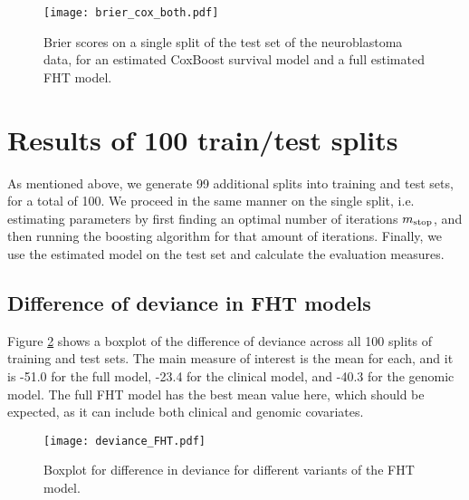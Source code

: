 \begin{figure}
\caption{Brier scores on a single split of the test set of the neuroblastoma data, for an estimated CoxBoost survival model and a full estimated FHT model.}
\label{fig:brier-cox-both}
\centering\texttt{[image: brier\_cox\_both.pdf]}
\end{figure}




\section{Results of 100 train/test splits}
As mentioned above, we generate 99 additional splits into training and test sets, for a total of 100.
We proceed in the same manner on the single split, i.e. estimating parameters by first finding an optimal number of iterations $m_{\text{stop}}$, and then running the boosting algorithm for that amount of iterations.
Finally, we use the estimated model on the test set and calculate the evaluation measures.

\subsection{Difference of deviance in FHT models}
Figure \ref{fig:neuroblastoma-deviances} shows a boxplot of the difference of deviance across all 100 splits of training and test sets.
The main measure of interest is the mean for each, and it is -51.0 for the full model, -23.4 for the clinical model, and -40.3 for the genomic model.
The full FHT model has the best mean value here, which should be expected, as it can include both clinical and genomic covariates.

\begin{figure}
\caption{Boxplot for difference in deviance for different variants of the FHT model.}
\label{fig:neuroblastoma-deviances}
\centering
\texttt{[image: deviance\_FHT.pdf]}
\end{figure}

